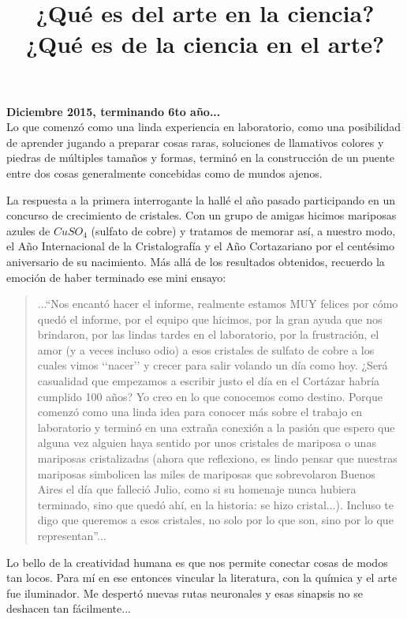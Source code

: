 \documentclass[16pt, a4 paper]{article}
\title{¿Qu\'e es del arte en la ciencia? ¿Qu\'e es de la ciencia en el arte?}
\date{}
\begin{document}
\maketitle

\textbf{Diciembre 2015, terminando 6to año...} \\

Lo que comenz\'o como una linda experiencia en laboratorio, como una posibilidad de aprender jugando a preparar cosas raras, soluciones de llamativos colores y piedras de m\'ultiples tama\~nos y formas, termin\'o en la construcci\'on de un puente entre dos cosas generalmente concebidas como de mundos ajenos. 

La respuesta a la primera interrogante la hall\'e el a\~no pasado participando en un concurso de crecimiento de cristales. Con un grupo de amigas hicimos mariposas azules de $CuSO_{4}$ (sulfato de cobre) y tratamos de memorar as\'i, a nuestro modo, el A\~no Internacional de la Cristalograf\'ia y el A\~no Cortazariano por el cent\'esimo aniversario de su nacimiento. M\'as all\'a de los resultados obtenidos, recuerdo la emoci\'on de haber terminado ese mini ensayo:

\begin{quote}
...“Nos encant\'o hacer el informe, realmente estamos MUY felices por c\'omo qued\'o el informe, por el equipo que hicimos, por la gran ayuda que nos brindaron, por las lindas tardes en el laboratorio, por la frustraci\'on, el amor (y a veces incluso odio) a esos cristales de sulfato de cobre a los cuales vimos \lq\lq{nacer}\rq\rq{} y crecer para salir volando un d\'ia como hoy. ¿Ser\'a casualidad que empezamos a escribir justo el d\'ia en el Cort\'azar habr\'ia cumplido 100 a\~nos? Yo creo en lo que conocemos como destino. Porque comenz\'o como una linda idea para conocer m\'as sobre el trabajo en laboratorio y termin\'o en una extra\~na conexi\'on a la pasi\'on que espero que alguna vez alguien haya sentido por unos cristales de mariposa o unas mariposas cristalizadas (ahora que reflexiono, es lindo pensar que nuestras mariposas simbolicen las miles de mariposas que sobrevolaron Buenos Aires el d\'ia que falleci\'o Julio, como si su homenaje nunca hubiera terminado, sino que qued\'o ah\'i, en la historia: se hizo cristal...). Incluso te digo que queremos a esos cristales, no solo por lo que son, sino por lo que representan”...
\end{quote}

Lo bello de la creatividad humana es que nos permite conectar cosas de modos tan locos. Para m\'i en ese entonces vincular la literatura, con la qu\'imica y el arte fue iluminador. Me despert\'o nuevas rutas neuronales y esas sinapsis no se deshacen tan f\'acilmente...
\end{document}

